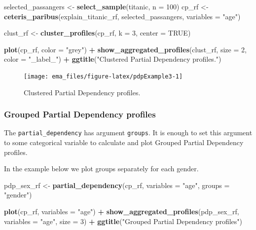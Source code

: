 \documentclass[12pt,]{krantz}
\newenvironment{Shaded}{\begin{snugshade}}{\end{snugshade}}
\newcommand{\DataTypeTok}[1]{\textcolor[rgb]{0.13,0.29,0.53}{#1}}
\newcommand{\DecValTok}[1]{\textcolor[rgb]{0.00,0.00,0.81}{#1}}
\newcommand{\KeywordTok}[1]{\textcolor[rgb]{0.13,0.29,0.53}{\textbf{#1}}}
\newcommand{\NormalTok}[1]{#1}
\newcommand{\OperatorTok}[1]{\textcolor[rgb]{0.81,0.36,0.00}{\textbf{#1}}}
\newcommand{\OtherTok}[1]{\textcolor[rgb]{0.56,0.35,0.01}{#1}}
\newcommand{\StringTok}[1]{\textcolor[rgb]{0.31,0.60,0.02}{#1}}
\begin{document}
\begin{Shaded}
\begin{Highlighting}[]
\NormalTok{selected_passangers <-}\StringTok{ }\KeywordTok{select_sample}\NormalTok{(titanic, }\DataTypeTok{n =} \DecValTok{100}\NormalTok{)}
\NormalTok{cp_rf <-}\StringTok{ }\KeywordTok{ceteris_paribus}\NormalTok{(explain_titanic_rf, selected_passangers, }\DataTypeTok{variables =} \StringTok{"age"}\NormalTok{)}

\NormalTok{clust_rf <-}\StringTok{ }\KeywordTok{cluster_profiles}\NormalTok{(cp_rf, }\DataTypeTok{k =} \DecValTok{3}\NormalTok{, }\DataTypeTok{center =} \OtherTok{TRUE}\NormalTok{)}

\KeywordTok{plot}\NormalTok{(cp_rf, }\DataTypeTok{color =} \StringTok{"grey"}\NormalTok{) }\OperatorTok{+}
\StringTok{  }\KeywordTok{show_aggregated_profiles}\NormalTok{(clust_rf, }\DataTypeTok{size =} \DecValTok{2}\NormalTok{, }\DataTypeTok{color =} \StringTok{"_label_"}\NormalTok{) }\OperatorTok{+}
\StringTok{  }\KeywordTok{ggtitle}\NormalTok{(}\StringTok{"Clustered Partial Dependency profiles."}\NormalTok{) }
\end{Highlighting}
\end{Shaded}

\begin{figure}

{\centering \texttt{[image: ema\_files/figure-latex/pdpExample3-1]} 

}

\caption{Clustered Partial Dependency profiles.}\label{fig:pdpExample3}
\end{figure}

\hypertarget{grouped-partial-dependency-profiles-2}{%
\subsubsection{Grouped Partial Dependency profiles}\label{grouped-partial-dependency-profiles-2}}

The \texttt{partial\_dependency} has argument \texttt{groups}. It is enough to set this argument to some categorical variable to calculate and plot Grouped Partial Dependency profiles.

In the example below we plot groups separately for each gender.

\begin{Shaded}
\begin{Highlighting}[]
\NormalTok{pdp_sex_rf <-}\StringTok{ }\KeywordTok{partial_dependency}\NormalTok{(cp_rf, }\DataTypeTok{variables =} \StringTok{"age"}\NormalTok{,}
                \DataTypeTok{groups =} \StringTok{"gender"}\NormalTok{)}

\KeywordTok{plot}\NormalTok{(cp_rf, }\DataTypeTok{variables =} \StringTok{"age"}\NormalTok{) }\OperatorTok{+}
\StringTok{  }\KeywordTok{show_aggregated_profiles}\NormalTok{(pdp_sex_rf, }\DataTypeTok{variables =} \StringTok{"age"}\NormalTok{, }\DataTypeTok{size =} \DecValTok{3}\NormalTok{) }\OperatorTok{+}
\StringTok{  }\KeywordTok{ggtitle}\NormalTok{(}\StringTok{"Grouped Partial Dependency profiles"}\NormalTok{) }
\end{Highlighting}
\end{Shaded}
\end{document}
